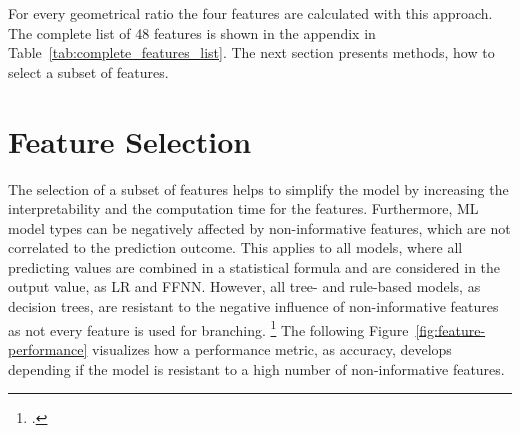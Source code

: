 For every geometrical ratio the four features are calculated with this approach.
The complete list of 48 features is shown in the appendix in Table~\ref{tab:complete_features_list}. The next section
presents methods, how to select a subset of features.

\section{Feature Selection}
\label{sec:feature_engineering}

The selection of a subset of features helps to simplify the model by increasing the interpretability and the computation time
for the features. Furthermore, \gls{ML} model types can be negatively affected by non-informative features, which are not correlated
to the prediction outcome. This applies to all models, where all predicting values are combined in a statistical formula
and are considered in the output value, as \gls{LR} and \gls{FFNN}. However, all tree- and rule-based models, as decision trees, are resistant
to the negative influence of non-informative features as not every feature is used for branching. \footcite[cf.][pp. 487--489]{kuhn_applied_2016}
The following Figure~\ref{fig:feature-performance} visualizes how a performance metric, as accuracy, develops depending if the model is
resistant to a high number of non-informative features.


